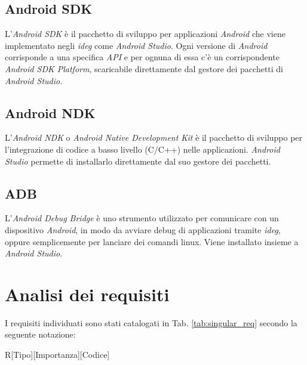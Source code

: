 \subsection*{Android SDK}

L'\emph{Android SDK} è il pacchetto di sviluppo per applicazioni \emph{Android} che viene implementato negli \emph{\gls{ideg}} come \emph{Android Studio}.
Ogni versione di \emph{Android} corrisponde a una specifica \emph{API} e per ognuna di essa c'è un corrispondente \emph{Android SDK Platform}, scaricabile direttamente dal gestore dei pacchetti di \emph{Android Studio}.



\subsection*{Android NDK}

L'\emph{Android NDK} o \emph{Android Native Development Kit} è il pacchetto di sviluppo per l'integrazione di codice a basso livello (C/C++) nelle applicazioni. \emph{Android Studio} permette di installarlo direttamente dal suo gestore dei pacchetti.

\subsection*{ADB}

L'\emph{Android Debug Bridge} è uno strumento utilizzato per comunicare con un dispositivo \emph{Android}, in modo da avviare debug di applicazioni tramite \emph{\gls{ideg}}, oppure semplicemente per lanciare dei comandi linux.
Viene installato insieme a \emph{Android Studio}.

\section{Analisi dei requisiti}

I requisiti individuati sono stati catalogati in Tab. \ref{tab:singular_req} secondo la seguente notazione:\\

\centerline{R[Tipo][Importanza][Codice]}\\

